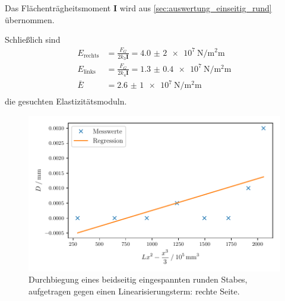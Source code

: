 Das Flächenträgheitsmoment $\mathbf{I}$ wird aus \autoref{sec:auswertung_einseitig_rund} übernommen.
%

Schließlich sind
\begin{align*}
  E_\text{rechts}
  &= \frac{F_G}{2 k_3 \mathbf{I}}
  = \SI[{scientific-notation = true, separate-uncertainty = true}]{4.0(20)e7}{\newton\per\square\milli\meter} \\
  E_\text{links}
  &= \frac{F_G}{2 k_4 \mathbf{I}}
  = \SI[{scientific-notation = true, separate-uncertainty = true}]{1.3(04)e7}{\newton\per\square\milli\meter} \\
  \bar{E}
  &= \SI[{scientific-notation = true, separate-uncertainty = true}]{2.6(10)e7}{\newton\per\square\milli\meter}
  \tag{arithmetisches Mittel} \\
\end{align*}
die gesuchten Elastizitätsmoduln.



\begin{figure}
  \centering
  \includegraphics[scale=0.8]{build/plot_beidseitig_rund_rechts.pdf}
  \caption{Durchbiegung eines beidseitig eingespannten runden Stabes, aufgetragen gegen einen Linearisierungsterm: rechte Seite.}
  \label{fig:regression3}
\end{figure}

